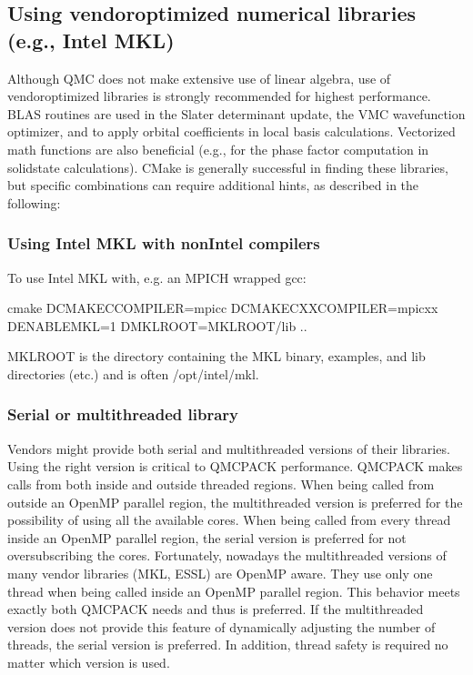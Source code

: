 \documentclass[letterpaper,10pt,english]{sphinxmanual}
\begin{document}
\subsection{Using vendor\sphinxhyphen{}optimized numerical libraries (e.g., Intel MKL)}
\label{\detokenize{installation:using-vendor-optimized-numerical-libraries-e-g-intel-mkl}}
Although QMC does not make extensive use of linear algebra, use of
vendor\sphinxhyphen{}optimized libraries is strongly recommended for highest
performance. BLAS routines are used in the Slater determinant update, the VMC wavefunction optimizer,
and to apply orbital coefficients in local basis calculations. Vectorized
math functions are also beneficial (e.g., for the phase factor
computation in solid\sphinxhyphen{}state calculations). CMake is generally successful
in finding these libraries, but specific combinations can require
additional hints, as described in the following:


\subsubsection{Using Intel MKL with non\sphinxhyphen{}Intel compilers}
\label{\detokenize{installation:using-intel-mkl-with-non-intel-compilers}}
To use Intel MKL with, e.g. an MPICH wrapped gcc:

\begin{sphinxVerbatim}[commandchars=\\\{\}]
cmake \PYGZbs{}
  \PYGZhy{}DCMAKE\PYGZus{}C\PYGZus{}COMPILER=mpicc \PYGZhy{}DCMAKE\PYGZus{}CXX\PYGZus{}COMPILER=mpicxx \PYGZbs{}
  \PYGZhy{}DENABLE\PYGZus{}MKL=1 \PYGZhy{}DMKL\PYGZus{}ROOT=\PYGZdl{}MKLROOT/lib \PYGZbs{}
  ..
\end{sphinxVerbatim}

MKLROOT is the directory containing the MKL binary, examples, and lib
directories (etc.) and is often /opt/intel/mkl.


\subsubsection{Serial or multithreaded library}
\label{\detokenize{installation:serial-or-multithreaded-library}}\label{\detokenize{installation:threadedlibrary}}
Vendors might provide both serial and multithreaded versions of their libraries.
Using the right version is critical to QMCPACK performance.
QMCPACK makes calls from both inside and outside threaded regions.
When being called from outside an OpenMP parallel region, the multithreaded version is preferred for the possibility of using all the available cores.
When being called from every thread inside an OpenMP parallel region, the serial version is preferred for not oversubscribing the cores.
Fortunately, nowadays the multithreaded versions of many vendor libraries (MKL, ESSL) are OpenMP aware.
They use only one thread when being called inside an OpenMP parallel region.
This behavior meets exactly both QMCPACK needs and thus is preferred.
If the multithreaded version does not provide this feature of dynamically adjusting the number of threads,
the serial version is preferred. In addition, thread safety is required no matter which version is used.
\end{document}
